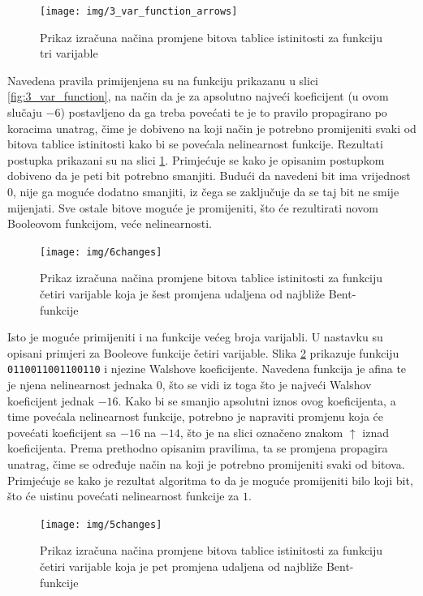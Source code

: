 \begin{figure}[ht!] 
    \centering
    \texttt{[image: img/3\_var\_function\_arrows]}
    \captionsetup{justification=centering}
    \caption{Prikaz izračuna načina promjene bitova tablice istinitosti za funkciju tri varijable}
    \label{fig:3_var_function_arrows}
\end{figure}
Navedena pravila primijenjena su na funkciju prikazanu u slici \ref{fig:3_var_function}, na način da je za apsolutno najveći koeficijent (u ovom slučaju $-6$) postavljeno da ga treba povećati te je to pravilo propagirano po koracima unatrag, čime je dobiveno na koji način je potrebno promijeniti svaki od bitova tablice istinitosti kako bi se povećala nelinearnost funkcije.
Rezultati postupka prikazani su na slici \ref{fig:3_var_function_arrows}. 
Primjećuje se kako je opisanim postupkom dobiveno da je peti bit potrebno smanjiti.
Budući da navedeni bit ima vrijednost $0$, nije ga moguće dodatno smanjiti, iz čega se zaključuje da se taj bit ne smije mijenjati.
Sve ostale bitove moguće je promijeniti, što će rezultirati novom Booleovom funkcijom, veće nelinearnosti.

\begin{figure}[ht!] 
    \centering
    \texttt{[image: img/6changes]}
    \captionsetup{justification=centering}
    \caption{Prikaz izračuna načina promjene bitova tablice istinitosti za funkciju četiri varijable koja je šest promjena udaljena od najbliže Bent-funkcije}
    \label{fig:6changes}
\end{figure}

Isto je moguće primijeniti i na funkcije većeg broja varijabli.
U nastavku su opisani primjeri za Booleove funkcije četiri varijable.
Slika \ref{fig:6changes} prikazuje funkciju \texttt{0110011001100110} i njezine Walshove koeficijente.
Navedena funkcija je afina te je njena nelinearnost jednaka $0$, što se vidi iz toga što je najveći Walshov koeficijent jednak $-16$.
Kako bi se smanjio apsolutni iznos ovog koeficijenta, a time povećala nelinearnost funkcije, potrebno je napraviti promjenu koja će povećati koeficijent sa $-16$ na $-14$, što je na slici označeno znakom $\uparrow$ iznad koeficijenta. 
Prema prethodno opisanim pravilima, ta se promjena propagira unatrag, čime se određuje način na koji je potrebno promijeniti svaki od bitova.
Primjećuje se kako je rezultat algoritma to da je moguće promijeniti bilo koji bit, što će uistinu povećati nelinearnost funkcije za $1$.

\begin{figure}[ht!] 
    \centering
    \texttt{[image: img/5changes]}
    \captionsetup{justification=centering}
    \caption{Prikaz izračuna načina promjene bitova tablice istinitosti za funkciju četiri varijable koja je pet promjena udaljena od najbliže Bent-funkcije}
    \label{fig:5changes}
\end{figure}

